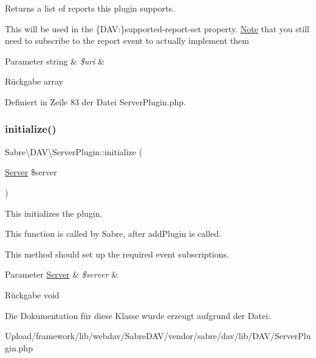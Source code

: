 Returns a list of reports this plugin supports.

This will be used in the \{D\+AV\+:\}supported-\/report-\/set property. \mbox{\hyperlink{class_note}{Note}} that you still need to subscribe to the \textquotesingle{}report\textquotesingle{} event to actually implement them


\begin{DoxyParams}[1]{Parameter}
string & {\em \$uri} & \\
\hline
\end{DoxyParams}
\begin{DoxyReturn}{Rückgabe}
array 
\end{DoxyReturn}


Definiert in Zeile 83 der Datei Server\+Plugin.\+php.

\mbox{\label{class_sabre_1_1_d_a_v_1_1_server_plugin_aeb2fadb199224163c831cf5f04a1373e}} 
\subsubsection{\texorpdfstring{initialize()}{initialize()}}
{\footnotesize\ttfamily Sabre\textbackslash{}\+D\+A\+V\textbackslash{}\+Server\+Plugin\+::initialize (\begin{DoxyParamCaption}\item[{\mbox{\hyperlink{class_sabre_1_1_d_a_v_1_1_server}{Server}}}]{\$server }\end{DoxyParamCaption})\hspace{0.3cm}{\ttfamily [abstract]}}

This initializes the plugin.

This function is called by Sabre, after add\+Plugin is called.

This method should set up the required event subscriptions.


\begin{DoxyParams}[1]{Parameter}
\mbox{\hyperlink{class_sabre_1_1_d_a_v_1_1_server}{Server}} & {\em \$server} & \\
\hline
\end{DoxyParams}
\begin{DoxyReturn}{Rückgabe}
void 
\end{DoxyReturn}


Die Dokumentation für diese Klasse wurde erzeugt aufgrund der Datei\+:\begin{DoxyCompactItemize}
\item 
Upload/framework/lib/webdav/\+Sabre\+D\+A\+V/vendor/sabre/dav/lib/\+D\+A\+V/Server\+Plugin.\+php\end{DoxyCompactItemize}
